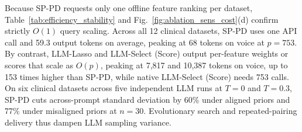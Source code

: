 Because SP-PD requests only one offline feature ranking per dataset, Table~\ref{tab:efficiency_stability} and Fig.~\ref{fig:ablation_sens_cost}(d) confirm strictly $O(1)$ query scaling. Across all 12 clinical datasets, SP-PD uses one API call and 59.3 output tokens on average, peaking at 68 tokens on voice at $p = 753$. By contrast, LLM-Lasso and LLM-Select (Score) output per-feature weights or scores that scale as $O(p)$, peaking at 7,817 and 10,387 tokens on voice, up to 153 times higher than SP-PD, while native LLM-Select (Score) needs 753 calls. On six clinical datasets across five independent LLM runs at $T = 0$ and $T = 0.3$, SP-PD cuts across-prompt standard deviation by 60\% under aligned priors and 77\% under misaligned priors at $n = 30$. Evolutionary search and repeated-pairing delivery thus dampen LLM sampling variance.
